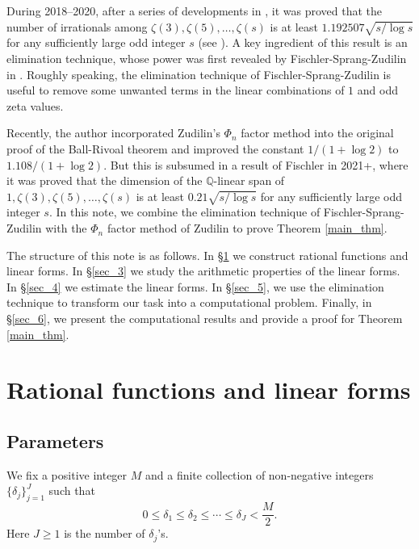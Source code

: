 \documentclass[12pt]{article}
\numberwithin{equation}{section}
\begin{document}
During 2018--2020, after a series of developments in \cite{Zud2018,Spr2018+,FSZ2019,LY2020}, it was proved that the number of irrationals among $\zeta(3),\zeta(5),\ldots,\zeta(s)$ is at least $1.192507 \sqrt{s/\log s}$ for any sufficiently large odd integer $s$ (see \cite[Thm. 1.1]{LY2020}). A key ingredient of this result is an elimination technique, whose power was first revealed by Fischler-Sprang-Zudilin in \cite{FSZ2019}. Roughly speaking, the elimination technique of Fischler-Sprang-Zudilin is useful to remove some unwanted terms in the linear combinations of $1$ and odd zeta values. 

Recently, the author \cite{Lai2024+} incorporated Zudilin's $\Phi_n$ factor method into the original proof of the Ball-Rivoal theorem \cite{BR2001} and improved the constant $1/(1+\log 2)$ to $1.108/(1+\log 2)$. But this is subsumed in a result of Fischler \cite{Fis2021+} in 2021+, where it was proved that the dimension of the $\mathbb{Q}$-linear span of $1,\zeta(3),\zeta(5),\ldots,\zeta(s)$ is at least $0.21 \sqrt{s/\log s}$ for any sufficiently large odd integer $s$. In this note, we combine the elimination technique of Fischler-Sprang-Zudilin with the $\Phi_n$ factor method of Zudilin to prove Theorem \ref{main_thm}. 

\bigskip

The structure of this note is as follows. In \S \ref{sec_2} we construct rational functions and linear forms. In \S \ref{sec_3} we study the arithmetic properties of the linear forms. In \S \ref{sec_4} we estimate the linear forms. In \S \ref{sec_5}, we use the elimination technique to transform our task into a computational problem. Finally, in \S \ref{sec_6}, we present the computational results and provide a proof for Theorem \ref{main_thm}.


\section{Rational functions and linear forms}\label{sec_2}

\subsection{Parameters}

We fix a positive integer $M$ and a finite collection of non-negative integers $\{ \delta_{j} \}_{j=1}^{J}$ such that
\[ 0 \leqslant \delta_1 \leqslant \delta_2 \leqslant \cdots \leqslant \delta_J < \frac{M}{2}. \]
Here $J \geqslant 1$ is the number of $\delta_j$'s.
\end{document}
